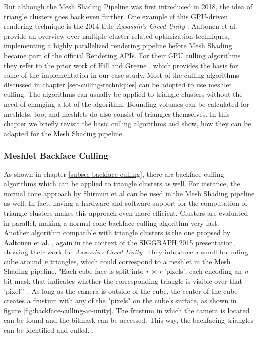 \noindent
But although the Mesh Shading Pipeline was first introduced in 2018, the idea of triangle clusters goes back even further.
One example of this \ac{GPU}-driven rendering technique is the 2014 title \emph{Assassin's Creed Unity} \cite{Ubisoft2014}.
Aaltonen et al. \cite{Aaltonen2015} provide an overview over multiple cluster related optimization techniques, implementing 
a highly parallelized rendering pipeline before Mesh Shading became part of the official Rendering \ac{API}s.
For their \ac{GPU} culling algorithms they refer to the prior work of Hill \cite{Hill11} and Greene \cite{Greene93}, which 
provides the basis for some of the implementation in our case study. Most of the culling algorithms discussed in chapter 
\ref{sec-culling-techniques} can be adopted to use meshlet culling. The algorithms can usually be applied to triangle clusters 
without the need of changing a lot of the algorithm. Bounding volumes can be calculated for meshlets, too, and meshlets do also 
consist of triangles themselves. In this chapter we briefly revisit the basic culling algorithms and show, how they can be 
adapted for the Mesh Shading pipeline.

\subsubsection{Meshlet Backface Culling} \label{subsubsec-meshlet-backface-culling}

As shown in chapter \ref{subsec-backface-culling}, there are backface culling algorithms which can be applied to 
triangle clusters as well. For instance, the normal cone approach by Shirmun et al \cite{Shirmun1993} can be used 
in the Mesh Shading pipeline as well. In fact, having a hardware and software support for the computation of triangle 
clusters makes this approach even more efficient. Clusters are evaluated in parallel, making a normal cone backface 
culling algorithm very fast. \\

\noindent
Another algorithm compatible with triangle clusters is the one propsed by Aaltonen et al. \cite{Aaltonen2015}, again 
in the context of the SIGGRAPH 2015 presentation, showing their work for \emph{Assassins Creed Unity}. They introduce 
a small bounding cube around \emph{n} triangles, which could correspond to a meshlet in the Mesh Shading pipeline. 
"Each cube face is split into \emph{r} \begin{math}\times\end{math} \emph{r} 'pixels', each encoding an \emph{n}-
bit mask that indicates whether the corresponding triangle is visible over that 'pixel'" \cite{AkenineMoeller2018}.
As long as the camera is outside of the cube, the center of the cube creates a frustum with any of the "pixels" on 
the cube's surface, as shown in figure \ref{fig:backface-culling-ac-unity}. The frustum in which the camera is 
located can be found and the bitmask can be accessed. This way, the backfacing triangles can be identified and 
culled. \cite{Aaltonen2015}, \cite{AkenineMoeller2018}

